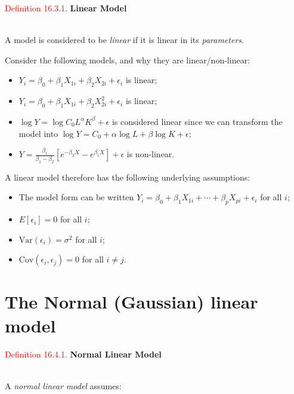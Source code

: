 \documentclass[
]{book}
\providecommand{\tightlist}{%
  \setlength{\itemsep}{0pt}\setlength{\parskip}{0pt}}
\begin{document}
\leavevmode{}%
\textcolor{red}{Definition 16.3.1.}
{\textbf{Linear Model}}\\
\strut \\
A model is considered to be \emph{linear} if it is linear in its \emph{parameters}.

Consider the following models, and why they are linear/non-linear:

\begin{itemize}
\tightlist
\item
  \(Y_i = \beta_0 + \beta_1 X_{1i} + \beta_2 X_{2i} + \epsilon_i\) is linear;\\
\item
  \(Y_i = \beta_0 + \beta_1 X_{1i} + \beta_2 X_{2i}^2 + \epsilon_i\) is linear;\\
\item
  \(\log Y = \log C_0 L^\alpha K^\beta + \epsilon\) is considered linear since we can transform the model into \(\log Y = C_0 + \alpha \log L + \beta \log K + \epsilon\);\\
\item
  \(Y = \frac{\beta_1}{\beta_1 - \beta_2} \left[ e^{-\beta_2 X} - e^{\beta_1 X} \right] + \epsilon\) is non-linear.
\end{itemize}

A linear model therefore has the following underlying assumptions:

\begin{itemize}
\tightlist
\item
  The model form can be written \(Y_i = \beta_0 + \beta_1 X_{1i} + \cdots + \beta_p X_{pi} + \epsilon_i\) for all \(i\);\\
\item
  \(E[\epsilon_i]=0\) for all \(i\);\\
\item
  \(\text{Var}(\epsilon_i) = \sigma^2\) for all \(i\);\\
\item
  \(\text{Cov}(\epsilon_i, \epsilon_j) = 0\) for all \(i \ne j\).
\end{itemize}

\hypertarget{Sec_LinearI:Gauss}{%
\section{The Normal (Gaussian) linear model}\label{Sec_LinearI:Gauss}}

\leavevmode{}%
\textcolor{red}{Definition 16.4.1.}
{\textbf{Normal Linear Model}}\\
\strut \\
A \emph{normal linear model} assumes:
\end{document}
